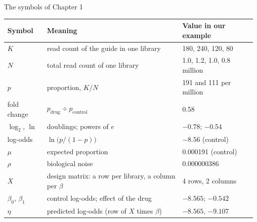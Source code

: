 \documentclass[aspectratio=169,11pt]{beamer}
\begin{document}
\begin{frame}{The symbols of Chapter 1}
\centering\footnotesize\renewcommand{\arraystretch}{0.95}
\begin{tabular}{@{}lll@{}}
\toprule
Symbol & Meaning & Value in our example\\
\midrule
$K$ & read count of the guide in one library & 180, 240, 120, 80\\
$N$ & total read count of one library & 1.0, 1.2, 1.0, 0.8 million\\
$p$ & proportion, $K/N$ & 191 and 111 per million\\
fold change & $p_{\text{drug}} \div p_{\text{control}}$ & 0.58\\
$\log_2$, $\ln$ & doublings; powers of $e$ & $-0.78$; $-0.54$\\
log-odds & $\ln\bigl(p/(1-p)\bigr)$ & $-8.56$ (control)\\
$\mu$ & expected proportion & 0.000191 (control)\\
$\rho$ & biological noise & 0.000000386\\
$X$ & design matrix: a row per library, a column per $\beta$ & 4 rows, 2 columns\\
$\beta_0$, $\beta_1$ & control log-odds; effect of the drug & $-8.565$; $-0.542$\\
$\eta$ & predicted log-odds (row of $X$ times $\beta$) & $-8.565$, $-9.107$\\
\bottomrule
\end{tabular}
\end{frame}
\end{document}

